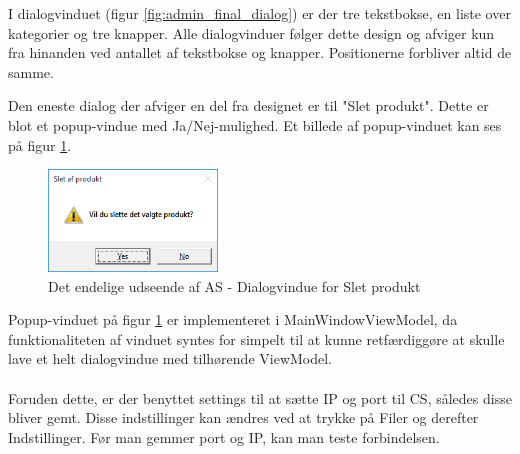 I dialogvinduet (figur \ref{fig:admin_final_dialog}) er der tre tekstbokse, en liste over kategorier og tre knapper. Alle dialogvinduer følger dette design og afviger kun fra hinanden ved antallet af tekstbokse og knapper. Positionerne forbliver altid de samme.

Den eneste dialog der afviger en del fra designet er til "Slet produkt". Dette er blot et popup-vindue med Ja/Nej-mulighed. Et billede af popup-vinduet kan ses på figur \ref{fig:admin_final_sletprodukt}.

\begin{figure}[H]
	\centering
	\includegraphics[width=0.4\textwidth]{Systemdesign/backend/Images/AdminDesignSletProdukt}
	\caption{Det endelige udseende af \gls{AS} - Dialogvindue for Slet produkt}
	\label{fig:admin_final_sletprodukt}
\end{figure}

Popup-vinduet på figur \ref{fig:admin_final_sletprodukt} er implementeret i MainWindowViewModel, da funktionaliteten af vinduet syntes for simpelt til at kunne retfærdiggøre at skulle lave et helt dialogvindue med tilhørende ViewModel.\\\\
Foruden dette, er der benyttet settings til at sætte IP og port til \gls{CS}, således disse bliver gemt. Disse indstillinger kan ændres ved at trykke på Filer og derefter Indstillinger. Før man gemmer port og IP, kan man teste forbindelsen.
